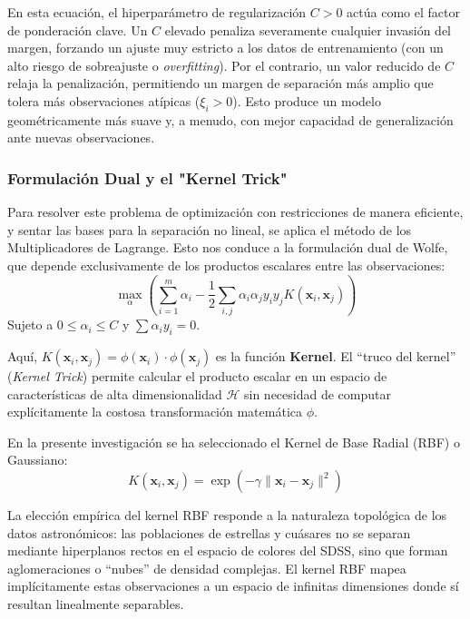 \documentclass[12pt, a4paper]{report}
\begin{document}
En esta ecuación, el hiperparámetro de regularización $C > 0$ actúa como el factor de ponderación clave. Un $C$ elevado penaliza severamente cualquier invasión del margen, forzando un ajuste muy estricto a los datos de entrenamiento (con un alto riesgo de sobreajuste o \textit{overfitting}). Por el contrario, un valor reducido de $C$ relaja la penalización, permitiendo un margen de separación más amplio que tolera más observaciones atípicas ($\xi_i > 0$). Esto produce un modelo geométricamente más suave y, a menudo, con mejor capacidad de generalización ante nuevas observaciones.

\subsubsection{Formulación Dual y el "Kernel Trick"}

Para resolver este problema de optimización con restricciones de manera eficiente, y sentar las bases para la separación no lineal, se aplica el método de los Multiplicadores de Lagrange. Esto nos conduce a la formulación dual de Wolfe, que depende exclusivamente de los productos escalares entre las observaciones:
\begin{equation}
    \max_{\alpha} \left( \sum_{i=1}^{m} \alpha_i - \frac{1}{2} \sum_{i,j} \alpha_i \alpha_j y_i y_j K(\mathbf{x}_i, \mathbf{x}_j) \right)
\end{equation}
Sujeto a $0 \leq \alpha_i \leq C$ y $\sum \alpha_i y_i = 0$.

Aquí, $K(\mathbf{x}_i, \mathbf{x}_j) = \phi(\mathbf{x}_i) \cdot \phi(\mathbf{x}_j)$ es la función \textbf{Kernel}. El ``truco del kernel'' (\textit{Kernel Trick}) permite calcular el producto escalar en un espacio de características de alta dimensionalidad $\mathcal{H}$ sin necesidad de computar explícitamente la costosa transformación matemática $\phi$.

En la presente investigación se ha seleccionado el Kernel de Base Radial (RBF) o Gaussiano:
\begin{equation}
    K(\mathbf{x}_i, \mathbf{x}_j) = \exp\left(-\gamma \|\mathbf{x}_i - \mathbf{x}_j\|^2\right)
\end{equation}

La elección empírica del kernel RBF responde a la naturaleza topológica de los datos astronómicos: las poblaciones de estrellas y cuásares no se separan mediante hiperplanos rectos en el espacio de colores del SDSS, sino que forman aglomeraciones o ``nubes'' de densidad complejas. El kernel RBF mapea implícitamente estas observaciones a un espacio de infinitas dimensiones donde sí resultan linealmente separables. 
\end{document}
